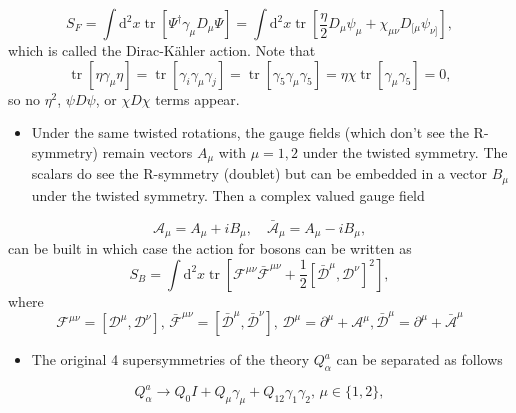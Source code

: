 \begin{equation}
    S_F = \int \text{d}^2 x \operatorname{tr}[\Psi^\dagger \gamma_\mu D_\mu \Psi] = \int \text{d}^2 x \operatorname{tr}\left[\frac{\eta}{2}D_\mu \psi_\mu + \chi_{\mu \nu}D_{[\mu}\psi_{\nu]}\right],
\end{equation}
which is called the Dirac-K\"ahler action. Note that
\begin{equation}
    \operatorname{tr}[\eta \gamma_\mu \eta] = \operatorname{tr}[\gamma_i \gamma_\mu \gamma_j] = \operatorname{tr}[\gamma_5 \gamma_\mu \gamma_5] = \eta \chi \operatorname{tr}[\gamma_\mu \gamma_5] = 0,
\end{equation}
so no $\eta^2$, $\psi D \psi$, or $\chi D \chi$ terms appear.
\begin{itemize}
    \item Under the same twisted rotations, the gauge fields (which don't see the R-symmetry) remain vectors $A_\mu$ with $\mu = 1,2$ under the twisted symmetry. The scalars do see the R-symmetry (doublet) but can be embedded in a vector $B_\mu$ under the twisted symmetry. Then a complex valued gauge field
\end{itemize}
\begin{equation}
    \mathcal{A}_\mu = A_\mu + i B_\mu, \quad \bar{\mathcal{A}}_\mu = A_\mu - i B_\mu,
\end{equation}
can be built in which case the action for bosons can be written as
\begin{equation}
    S_B = \int \text{d}^2 x \operatorname{tr}[\mathcal{F}^{\mu \nu}\bar{\mathcal{F}}^{\mu \nu} + \frac{1}{2}[\bar{\mathcal{D}}^\mu, \mathcal{D}^\nu]^2],
\end{equation}
where
\begin{equation}
    \mathcal{F}^{\mu \nu} = [\mathcal{D}^\mu, \mathcal{D}^\nu], \, \bar{\mathcal{F}}^{\mu \nu} = [\bar{\mathcal{D}}^\mu, \bar{\mathcal{D}}^\nu], \, \mathcal{D}^\mu = \partial^\mu + \mathcal{A}^\mu, \bar{\mathcal{D}}^\mu = \partial^\mu + \bar{\mathcal{A}}^\mu
\end{equation}
\begin{itemize}
    \item The original 4 supersymmetries of the theory $Q_\alpha^a$ can be separated as follows
\end{itemize}
\begin{equation}
    Q_\alpha^a \to Q_0 I + Q_\mu \gamma_\mu + Q_{12}\gamma_1 \gamma_2, \, \mu \in \{1,2\},
\end{equation}
